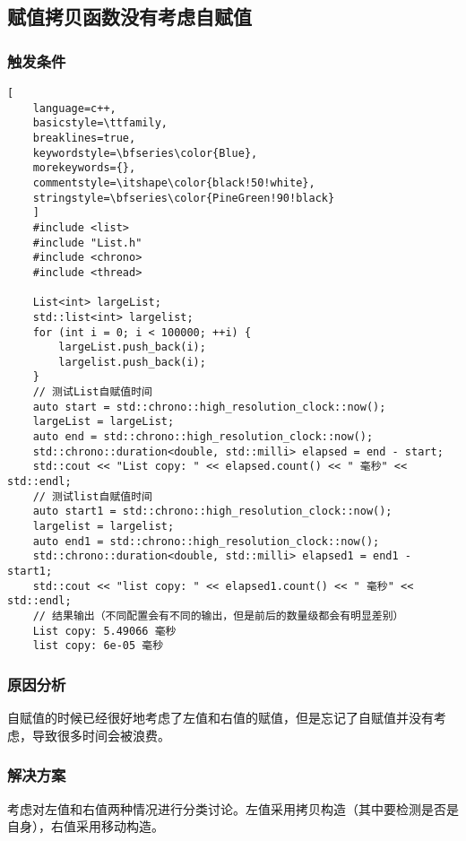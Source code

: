 \documentclass[UTF8]{ctexart}
\begin{document}
\subsection{赋值拷贝函数没有考虑自赋值}
\subsubsection{触发条件}
\begin{lstlisting}[ 
    language=c++,
    basicstyle=\ttfamily,
    breaklines=true,
    keywordstyle=\bfseries\color{Blue}, 
    morekeywords={}, 
    commentstyle=\itshape\color{black!50!white},
    stringstyle=\bfseries\color{PineGreen!90!black} 
    ]
    #include <list>
    #include "List.h"
    #include <chrono>
    #include <thread>

    List<int> largeList;
    std::list<int> largelist;
    for (int i = 0; i < 100000; ++i) {
        largeList.push_back(i);
        largelist.push_back(i);
    }
    // 测试List自赋值时间
    auto start = std::chrono::high_resolution_clock::now();
    largeList = largeList;
    auto end = std::chrono::high_resolution_clock::now();
    std::chrono::duration<double, std::milli> elapsed = end - start;
    std::cout << "List copy: " << elapsed.count() << " 毫秒" << std::endl;
    // 测试list自赋值时间
    auto start1 = std::chrono::high_resolution_clock::now();
    largelist = largelist;
    auto end1 = std::chrono::high_resolution_clock::now();
    std::chrono::duration<double, std::milli> elapsed1 = end1 - start1;
    std::cout << "list copy: " << elapsed1.count() << " 毫秒" << std::endl;
    // 结果输出（不同配置会有不同的输出，但是前后的数量级都会有明显差别）
    List copy: 5.49066 毫秒
    list copy: 6e-05 毫秒
\end{lstlisting}
\subsubsection{原因分析}
自赋值的时候已经很好地考虑了左值和右值的赋值，但是忘记了自赋值并没有考虑，导致很多时间会被浪费。
\subsubsection{解决方案}
考虑对左值和右值两种情况进行分类讨论。左值采用拷贝构造（其中要检测是否是自身），右值采用移动构造。
\end{document}
